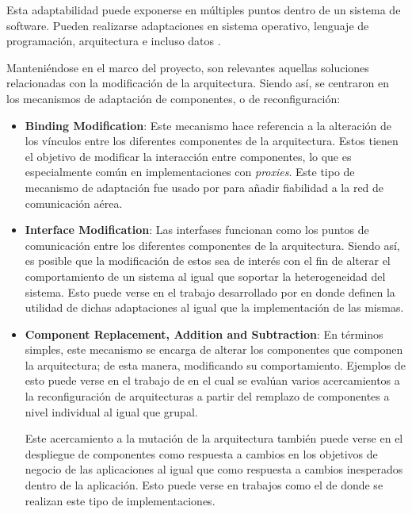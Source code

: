 Esta adaptabilidad puede exponerse en múltiples puntos dentro de un sistema de software. Pueden realizarse adaptaciones en sistema operativo, lenguaje de programación, arquitectura e incluso datos \cite{lalanda_diaconescu_mccann_2014}. 

Manteniéndose en el marco del proyecto, son relevantes aquellas soluciones relacionadas con la modificación de la arquitectura. Siendo así, se centraron en los mecanismos de adaptación de componentes, o de reconfiguración:

\begin{itemize}
    \item \textbf{Binding Modification}: Este mecanismo hace referencia a la alteración de los vínculos entre los diferentes componentes de la arquitectura. Estos tienen el objetivo de modificar la interacción entre componentes, lo que es especialmente común en implementaciones con \textit{proxies}. Este tipo de mecanismo de adaptación fue usado por \citeauthor{Kabashkin_2017} \citeyear{Kabashkin_2017} para añadir fiabilidad a la red de comunicación aérea.

    \item \textbf{Interface Modification}: Las interfases funcionan como los puntos de comunicación entre los diferentes componentes de la arquitectura. Siendo así, es posible que la modificación de estos sea de interés con el fin de alterar el comportamiento de un sistema al igual que soportar la heterogeneidad del sistema. Esto puede verse en el trabajo desarrollado por \citeauthor{Liu_2004} \citeyear{Liu_2004} en donde definen la utilidad de dichas adaptaciones al igual que la implementación de las mismas.

    \item \textbf{Component Replacement, Addition and Subtraction}: En términos simples, este mecanismo se encarga de alterar los componentes que componen la arquitectura; de esta manera, modificando su comportamiento. Ejemplos de esto puede verse en el trabajo de \citeauthor{Huynh_2019} \citeyear{Huynh_2019} en el cual se evalúan varios acercamientos a la reconfiguración de arquitecturas a partir del remplazo de componentes a nivel individual al igual que grupal. 
    
    Este acercamiento a la mutación de la arquitectura también puede verse en el despliegue de componentes como respuesta a cambios en los objetivos de negocio de las aplicaciones al igual que como respuesta a cambios inesperados dentro de la aplicación. Esto puede verse en trabajos como el de \citeauthor{Patouni_2006} \citeyear{Patouni_2006} donde se realizan este tipo de implementaciones. 

\end{itemize}

